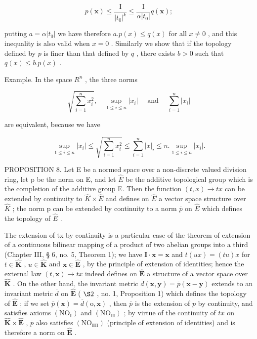 \[
p (\boldsymbol {x}) \leqslant \frac {\mathrm{I}}{\left| t _ {0} \right| ^ {k}} \leqslant \frac {\mathrm{I}}{\alpha \left| t _ {0} \right|} q (\boldsymbol {x});
\]

putting \(a = \alpha |t_0|\) we have therefore \(a.p(x) \leqslant q(x)\) for all \(x \neq 0\) , and this inequality is also valid when \(x = 0\) . Similarly we show that if the topology defined by \(p\) is finer than that defined by \(q\) , there exists \(b > 0\) such that \(q(x) \leqslant b.p(x)\) .

Example. In the space \(R^{n}\) , the three norms

\[
\sqrt {\sum_ {i = 1} ^ {n} x _ {i} ^ {2}}, \quad \sup _ {1 \leqslant i \leqslant n} | x _ {i} | \quad \text { and } \quad \sum_ {i = 1} ^ {n} | x _ {i} |
\]

are equivalent, because we have

\[
\sup _ {1 \leqslant i \leqslant n} | x _ {i} | \leqslant \sqrt {\sum_ {i = 1} ^ {n} x _ {i} ^ {2}} \leqslant \sum_ {i = 1} ^ {n} | x | _ {i} \leqslant n. \sup _ {1 \leqslant i \leqslant n} | x _ {i} |.\tag{2}
\]

PROPOSITION 8. Let E be a normed space over a non-discrete valued division ring, let p be the norm on E, and let \(\hat{E}\) be the additive topological group which is the completion of the additive group E. Then the function \((t, x) \to tx\) can be extended by continuity to \(\hat{K} \times \hat{E}\) and defines on \(\hat{E}\) a vector space structure over \(\hat{K}\) ; the norm p can be extended by continuity to a norm \(\overline{p}\) on \(\hat{E}\) which defines the topology of \(\hat{E}\) .

The extension of tx by continuity is a particular case of the theorem of extension of a continuous bilinear mapping of a product of two abelian groups into a third (Chapter III, § 6, no. 5, Theorem 1); we have \(\mathbf{I} \cdot \mathbf{x} = \mathbf{x}\) and \(t(ux) = (tu)x\) for \(t \in \hat{\mathbf{K}}\) , \(u \in \hat{\mathbf{K}}\) and \(\mathbf{x} \in \hat{\mathbf{E}}\) , by the principle of extension of identities; hence the external law \((t, \mathbf{x}) \to tx\) indeed defines on \(\hat{\mathbf{E}}\) a structure of a vector space over \(\hat{\mathbf{K}}\) . On the other hand, the invariant metric \(\overline{d}(\mathbf{x}, \mathbf{y}) = \overline{p}(\mathbf{x} - \mathbf{y})\) extends to an invariant metric \(\overline{d}\) on \(\hat{\mathbf{E}}\) ( \(\S 2\) , no. 1, Proposition 1) which defines the topology of \(\hat{\mathbf{E}}\) ; if we set \(\overline{p}(\mathbf{x}) = \overline{d}(\mathrm{o}, \mathbf{x})\) , then \(\overline{p}\) is the extension of \(p\) by continuity, and satisfies axioms \((\mathrm{NO}_{\mathbf{I}})\) and \((\mathrm{NO}_{\mathbf{II}})\) ; by virtue of the continuity of \(tx\) on \(\hat{\mathbf{K}} \times \hat{\mathbf{E}}\) , \(\overline{p}\) also satisfies \((\mathrm{NO}_{\mathbf{III}})\) (principle of extension of identities) and is therefore a norm on \(\hat{\mathbf{E}}\) .

